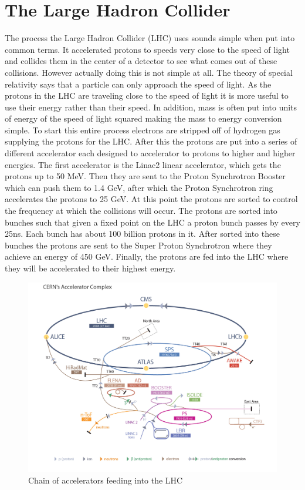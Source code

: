 
\section{The Large Hadron Collider}

The process the Large Hadron Collider (LHC) uses sounds simple when put into common terms. It accelerated protons to speeds very close to the speed of light and collides them in the center of a detector to see what comes out of these collisions. However actually doing this is not simple at all. The theory of special relativity says that a particle can only approach the speed of light. As the protons in the LHC are traveling close to the speed of light it is more useful to use their energy rather than their speed. In addition, mass is often put into units of energy of the speed of light squared making the mass to energy conversion simple. To start this entire process electrons are stripped off of hydrogen gas supplying the protons for the LHC. After this the protons are put into a series of different accelerator each designed to accelerator to protons to higher and higher energies. The first accelerator is the Linac2 linear accelerator, which gets the protons up to 50 MeV. Then they are sent to the Proton Synchrotron Booster which can push them to 1.4 GeV, after which the Proton Synchrotron ring accelerates the protons to 25 GeV. At this point the protons are sorted to control the frequency at which the collisions will occur. The protons are sorted into bunches such that given a fixed point on the LHC a proton bunch passes by every 25ns. Each bunch has about 100 billion protons in it. After sorted into these bunches the protons are sent to the Super Proton Synchrotron where they achieve an energy of 450 GeV. Finally, the protons are fed into the LHC where they will be accelerated to their highest energy.

\begin{figure}
\centering
\includegraphics[width=\linewidth]{acceleratorcomplex.jpg}
\caption{Chain of accelerators feeding into the LHC}
\label{fig:acceleratorcomplex}
\end{figure}

